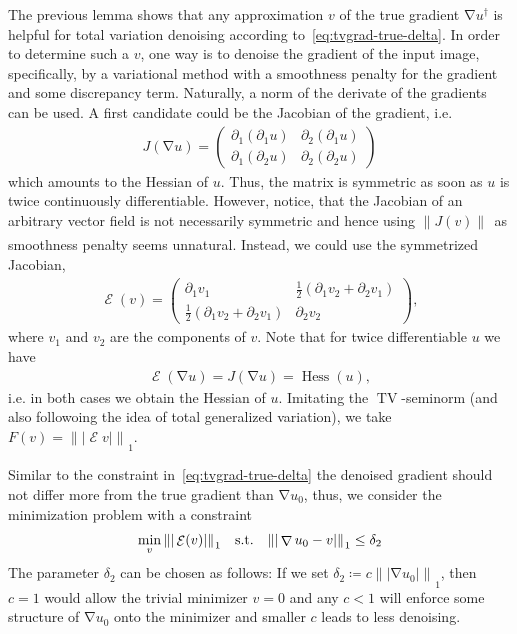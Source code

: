 \documentclass[twocolumn,envcountsame]{svjour3}
\newcommand{\norm}[2][]{{\|{#2}\|_{}}_{#1}}
\newcommand{\abs}[1]{|#1|}
\newcommand{\pmat}[1]{\begin{pmatrix} #1 \end{pmatrix}}
\newcommand{\udag}{u^{\dagger}}
\newcommand{\subjectto}{\text{\quad s.t.\quad }}
\DeclareMathOperator{\grad}{\nabla}
\DeclareMathOperator{\symgrad}{\mathcal{E}}
\DeclareMathOperator{\Hess}{Hess}
\DeclareMathOperator{\TV}{TV}
\begin{document}
The previous lemma shows that any approximation $v$ of the true gradient $\grad\udag$ is helpful for total variation denoising according to~\eqref{eq:tvgrad-true-delta}.
In order to determine such a $v$, one way is to denoise 
the gradient of the input image, specifically, by a variational method
with a smoothness penalty for the gradient and some discrepancy term. 
Naturally, a norm of the derivate 
of the gradients can be used. A first candidate could be the 
Jacobian of the gradient, i.e.
\begin{align*}
	J(\grad u) = \pmat{
					\partial_1(\partial_1 u) 
					& \partial_2(\partial_1 u)\\
					\partial_1(\partial_2 u) 
					& \partial_2(\partial_2 u)
				}
\end{align*}
which amounts to the Hessian of $u$. Thus, the matrix is 
symmetric as soon as $u$ is twice continuously differentiable.
However, notice, that the Jacobian of an arbitrary vector field
is not necessarily symmetric and hence using $\norm{J(v)}$
as smoothness penalty seems unnatural. Instead, we could use the symmetrized Jacobian,
\begin{align*}
	\symgrad(v) = \pmat{
				\partial_1 v_1
				& \tfrac{1}{2}(\partial_1 v_2 + \partial_2 v_1)\\
				\tfrac{1}{2}(\partial_1 v_2 + \partial_2 v_1)
				& \partial_2 v_2
				},
\end{align*}
where $v_1$ and $v_2$ are the components of $v$. 
Note that for twice differentiable $u$ we have
\begin{align*}
	\symgrad(\grad u) = J(\grad u) = \Hess(u),
\end{align*}
i.e. in both cases we obtain the Hessian of $u$. 
Imitating the $\TV$-seminorm (and also followoing the idea of total generalized variation), we take
$F(v) = \norm[1]{\abs{\symgrad v}}$.

Similar to the constraint in~\eqref{eq:tvgrad-true-delta} the 
denoised gradient should not differ more from the true gradient
than $\grad u_0$, thus, we consider the minimization problem with a constraint 
\begin{align*}
	\min_v\norm[1]{\abs{\symgrad(v)}}\subjectto
		\norm[1]{\abs{\grad u_0 - v}}
		\leq \delta_{2}%
\end{align*}
The parameter $\delta_{2}$ can be chosen as follows: If we set $\delta_{2} \coloneqq
c\norm[1]{\abs{\grad u_0}}$, then $c=1$ would allow the trivial minimizer $v=0$ and any $c<1$ will enforce some structure of $\grad u_{0}$ onto the minimizer and smaller $c$ leads to less denoising.
\end{document}
